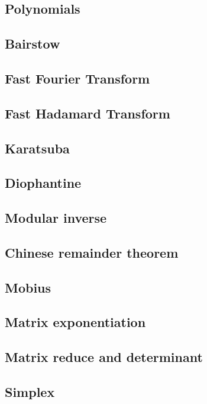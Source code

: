 \subsection{Polynomials}
\subsection{Bairstow}
\subsection{Fast Fourier Transform}
\subsection{Fast Hadamard Transform}
\subsection{Karatsuba}
\subsection{Diophantine}
\subsection{Modular inverse}
\subsection{Chinese remainder theorem}
\subsection{Mobius}
\subsection{Matrix exponentiation}
\subsection{Matrix reduce and determinant}
\subsection{Simplex}

